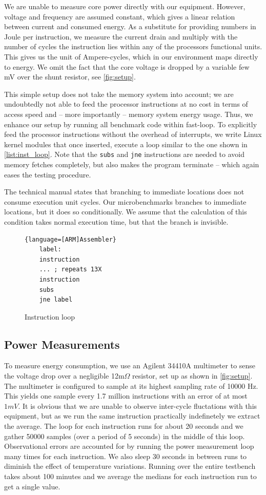 We are unable to measure core power directly with our equipment. However,
voltage and frequency are assumed constant, which gives a linear relation
between current and consumed energy. As a substitute for providing numbers in
Joule per instruction, we measure the current drain and multiply with the number
of cycles the instruction lies within any of the processors functional units.
This gives us the unit of Ampere-cycles, which in our environment maps directly
to energy.  We omit the fact that the core voltage is dropped by a variable few mV over
the shunt resistor, see \autoref{fig:setup}.

This simple setup does not take the memory system into account; we are
undoubtedly not able to feed the processor instructions at no cost in terms of
access speed and -- more importantly -- memory system energy usage. Thus, we
enhance our setup by running all benchmark code within fast-loop. To explicitly
feed the processor instructions without the overhead of interrupts, we write
Linux kernel modules that once inserted, execute a loop similar to the one shown
in \autoref{list:inst_loop}. Note that the \texttt{subs} and \texttt{jne}
instructions are needed to avoid memory fetches completely, but also makes the
program terminate -- which again eases the testing procedure.

The technical manual states that branching to immediate locations
does not consume execution unit cycles. Our microbenchmarks branches to
immediate locations, but it does so conditionally. We assume that the
calculation of this condition takes normal execution time, but that the branch
is invisible.

\begin{figure}
    \begin{lstlisting}{language=[ARM]Assembler}
    label:
    instruction
    ... ; repeats 13X
    instruction
    subs
    jne label
    \end{lstlisting}
    \caption{Instruction loop}
    \label{list:inst_loop}
\end{figure}

\subsection{Power Measurements}
To measure energy consumption, we use an Agilent 34410A
multimeter\cite{agilent34410a} to sense the voltage drop over a negligible
12m$\Omega$ resistor, set up as shown in \autoref{fig:setup}. The multimeter is
configured to sample at its highest sampling rate of 10000 Hz. This yields one
sample every 1.7 million instructions with an error of at most $1 mV$. It is
obvious that we are unable to observe inter-cycle fluctations with this
equipment, but as we run the same instruction practically indefinetely we
extract the average. The loop for each instruction runs for about 20 seconds and
we gather 50000 samples (over a period of 5 seconds) in the middle of this loop.
Observational errors are accounted for by running the power measurement loop
many times for each instruction. We also sleep 30 seconds in between runs to
diminish the effect of temperature variations. Running over the entire testbench
takes about 100 minutes and we average the medians for each instruction run to
get a single value.

